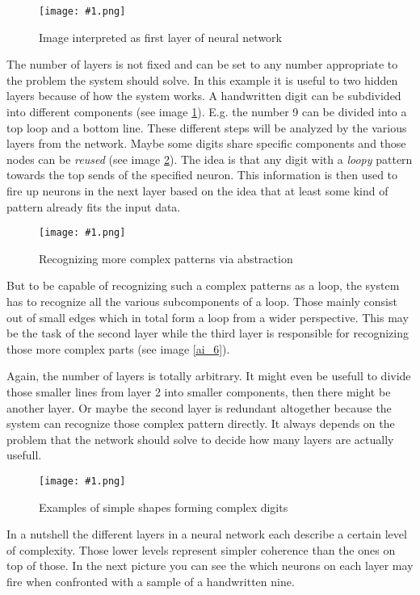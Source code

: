 \documentclass{article}
\newcommand{\lbl}[1]{(see image \ref{#1})}
\newcommand{\img}[1]{
	\centering
	\texttt{[image: \#1.png]}
	\label{#1}
}
\begin{document}
\begin{figure}[h]
\img{ai_3}
\caption{Image interpreted as first layer of neural network}
\end{figure}

The number of layers is not fixed and can be set to any number appropriate to the problem the system should solve. In this example it is useful to two hidden layers because of how the system works. A handwritten digit can be subdivided into different components \lbl{ai_3}. E.g. the number 9 can be divided into a top loop and a bottom line. These different steps will be analyzed by the various layers from the network. Maybe some digits share specific components and those nodes can be \textit{reused} \lbl{ai_4}. The idea is that any digit with a \textit{loopy} pattern towards the top sends of the specified neuron. This information is then used to fire up neurons in the next layer based on the idea that at least some kind of pattern already fits the input data.

\begin{figure}[h]
\img{ai_4}
\caption{Recognizing more complex patterns via abstraction}
\end{figure}

But to be capable of recognizing such a complex patterns as a loop, the system has to recognize all the various subcomponents of a loop. Those mainly consist out of small edges which in total form a loop from a wider perspective. This may be the task of the second layer while the third layer is responsible for recognizing those more complex parts \lbl{ai_6}. 

Again, the number of layers is totally arbitrary. It might even be usefull to divide those smaller lines from layer 2 into smaller components, then there might be another layer. Or maybe the second layer is redundant altogether because the system can recognize those complex pattern directly. It always depends on the problem that the network should solve to decide how many layers are actually usefull.

\begin{figure}[h]
\img{ai_5}
\caption{Examples of simple shapes forming complex digits}
\end{figure}

In a nutshell the different layers in a neural network each describe a certain level of complexity. Those lower levels represent simpler coherence than the ones on top of those. In the next picture you can see the which neurons on each layer may fire when confronted with a sample of a handwritten nine.
\end{document}
